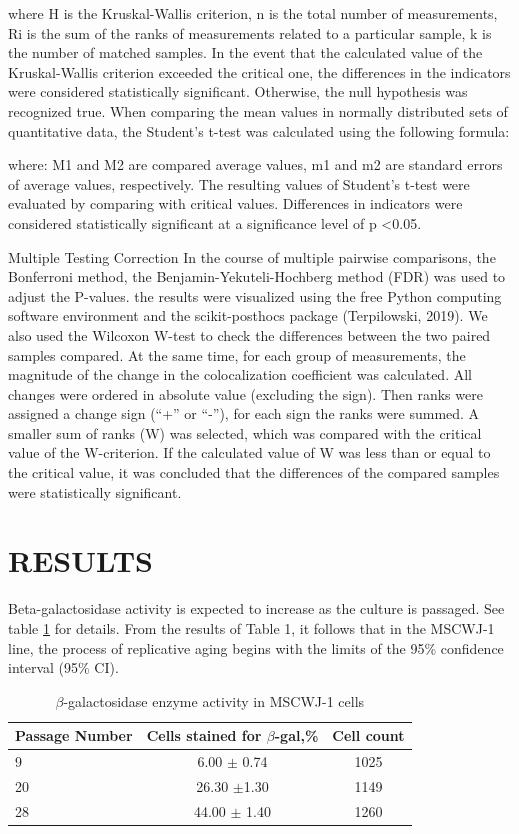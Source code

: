 \documentclass[english,authoryear]{elsarticle}
\begin{document}
where H is the Kruskal-Wallis criterion, n is the total number of measurements, Ri is the sum of the ranks of measurements related to a particular sample, k is the number of matched samples.
In the event that the calculated value of the Kruskal-Wallis criterion exceeded the critical one, the differences in the indicators were considered statistically significant. Otherwise, the null hypothesis was recognized true.
When comparing the mean values in normally distributed sets of quantitative data, the Student’s t-test was calculated using the following formula:

where: M1 and M2 are compared average values, m1 and m2 are standard errors of average values, respectively. The resulting values of Student's t-test were evaluated by comparing with critical values. Differences in indicators were considered statistically significant at a significance level of p <0.05.

Multiple Testing Correction
In the course of multiple pairwise comparisons, the Bonferroni method, the Benjamin-Yekuteli-Hochberg method (FDR) was used to adjust the P-values.
the results were visualized using the free Python computing software environment and the scikit-posthocs package (Terpilowski, 2019).
We also used the Wilcoxon W-test to check the differences between the two paired samples compared.
At the same time, for each group of measurements, the magnitude of the change in the colocalization coefficient was calculated.
All changes were ordered in absolute value (excluding the sign). Then ranks were assigned a change sign (“+” or “-”), for each sign the ranks were summed.
A smaller sum of ranks (W) was selected, which was compared with the critical value of the W-criterion.
If the calculated value of W was less than or equal to the critical value, it was concluded that the differences of the compared samples were statistically significant.


\section{RESULTS}

Beta-galactosidase activity is expected to increase as the culture is passaged. See table \ref{tab} for details. From the results of Table 1, it follows that in the MSCWJ-1 line, the process of replicative aging begins with the limits of the 95\% confidence interval (95\% CI).

\begin{table}
  \caption{$\beta$-galactosidase enzyme activity in MSCWJ-1 cells}
  \label{tab}
\centering
\begin{tabular}{l|c|c}
 Passage Number & Cells stained for $\beta$-gal,\% & Cell count  \\
 \hline
 9 & 6.00 $\pm$ 0.74 & 1025 \\
 20 & 26.30 $\pm$1.30 & 1149  \\
 28 & 44.00 $\pm$ 1.40 & 1260

\end{tabular}
\end{table}
\end{document}

